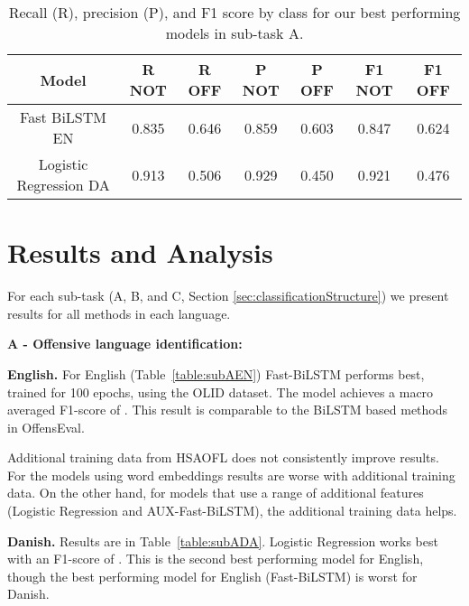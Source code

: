 \documentclass{article}
\begin{document}
\begin{table*}
\small
\centering
\caption{Recall (R), precision (P), and F1 score by class for our best performing models in sub-task A.}
\begin{tabular}{c|c|c|c|c|c|c}
\textbf{Model} & \textbf{R NOT} & \textbf{R OFF} & \textbf{P NOT} & \textbf{P OFF} & \textbf{F1 NOT} & \textbf{F1 OFF} \\\hline
Fast BiLSTM EN & 0.835      & 0.646      & 0.859         & 0.603         & 0.847  & 0.624  \\
Logistic Regression DA & 0.913      & 0.506      & 0.929         & 0.450         & 0.921  & 0.476 \\
\end{tabular}
\label{table:subABest}
\end{table*}





\section{Results and Analysis}
\label{ch:results}



For each sub-task (A, B, and C, Section \ref{sec:classificationStructure}) we present results for all methods in each language.



\textbf{A - Offensive language identification:}\label{sec:resultsSubA}


\textbf{English.} For English (Table~\ref{table:subAEN}) Fast-BiLSTM performs best, trained for 100 epochs, using the OLID dataset. The model achieves a macro averaged F1-score of . This result is comparable to the BiLSTM based methods in OffensEval. 

Additional training data from  HSAOFL \cite{davidson2017automated} does not consistently improve results. For the models using word embeddings results are worse with additional training data. 
On the other hand, for models that use a range of additional features (Logistic Regression and AUX-Fast-BiLSTM), the additional training data helps. 

\textbf{Danish.} Results are in Table~\ref{table:subADA}. Logistic Regression works best with an F1-score of . This is the second best performing model for English, though the best performing model for English (Fast-BiLSTM) is worst for Danish. 
\end{document}
